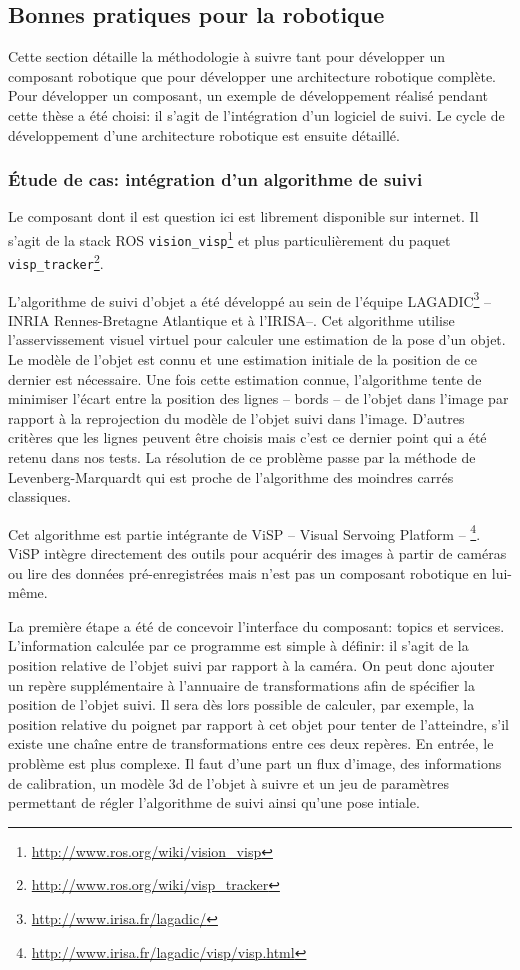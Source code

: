 \subsection{Bonnes pratiques pour la robotique}

Cette section détaille la méthodologie à suivre tant pour développer
un composant robotique que pour développer une architecture robotique
complète. Pour développer un composant, un exemple de développement
réalisé pendant cette thèse a été choisi: il s'agit de l'intégration
d'un logiciel de suivi. Le cycle de développement d'une architecture
robotique est ensuite détaillé.


\subsubsection{Étude de cas: intégration d'un algorithme de suivi}

Le composant dont il est question ici est librement disponible sur
internet. Il s'agit de la stack ROS
\texttt{vision\_visp}\footnote{\url{http://www.ros.org/wiki/vision_visp}}
et plus particulièrement du paquet
\texttt{visp\_tracker}\footnote{\url{http://www.ros.org/wiki/visp_tracker}}.


L'algorithme de suivi d'objet a été développé au sein de l'équipe
LAGADIC\footnote{\url{http://www.irisa.fr/lagadic/}} -- INRIA
Rennes-Bretagne Atlantique et à l'IRISA--. Cet algorithme utilise
l'asservissement visuel virtuel pour calculer une estimation de la
pose d'un objet. Le modèle de l'objet est connu et une estimation
initiale de la position de ce dernier est nécessaire. Une fois cette
estimation connue, l'algorithme tente de minimiser l'écart entre la
position des lignes -- bords -- de l'objet dans l'image par rapport à
la reprojection du modèle de l'objet suivi dans l'image. D'autres
critères que les lignes peuvent être choisis mais c'est ce dernier
point qui a été retenu dans nos tests. La résolution de ce problème
passe par la méthode de Levenberg-Marquardt qui est proche de
l'algorithme des moindres carrés classiques.


Cet algorithme est partie intégrante de ViSP -- Visual Servoing
Platform
-- \footnote{\url{http://www.irisa.fr/lagadic/visp/visp.html}}. ViSP
intègre directement des outils pour acquérir des images à partir de
caméras ou lire des données pré-enregistrées mais n'est pas un
composant robotique en lui-même.


La première étape a été de concevoir l'interface du composant: topics
et services. L'information calculée par ce programme est simple à
définir: il s'agit de la position relative de l'objet suivi par
rapport à la caméra. On peut donc ajouter un repère supplémentaire à
l'annuaire de transformations afin de spécifier la position de l'objet
suivi. Il sera dès lors possible de calculer, par exemple, la position
relative du poignet par rapport à cet objet pour tenter de
l'atteindre, s'il existe une chaîne entre de transformations entre ces
deux repères. En entrée, le problème est plus complexe. Il faut d'une
part un flux d'image, des informations de calibration, un modèle 3d de
l'objet à suivre et un jeu de paramètres permettant de régler
l'algorithme de suivi ainsi qu'une pose intiale.

